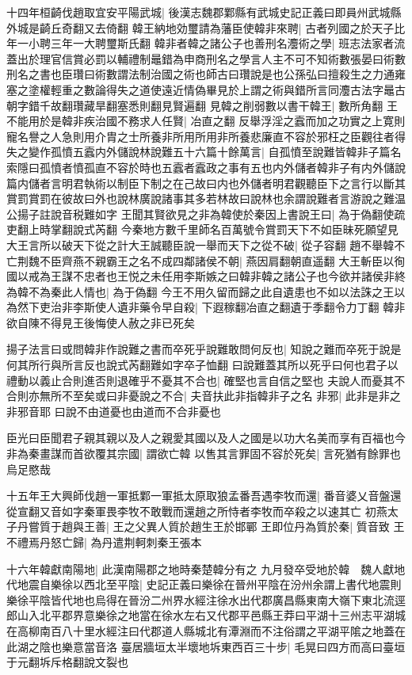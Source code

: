 十四年桓齮伐趙取宜安平陽武城|{
	後漢志魏郡鄴縣有武城史記正義曰即員州武城縣外城是齮丘奇翻又去倚翻}
韓王納地効璽請為藩臣使韓非來聘|{
	古者列國之於天子比年一小聘三年一大聘璽斯氏翻}
韓非者韓之諸公子也善刑名灋術之學|{
	班志法家者流蓋出於理官信賞必罰以輔禮制鼂錯為申商刑名之學言人主不可不知術數張晏曰術數刑名之書也臣瓚曰術數謂法制治國之術也師古曰瓚說是也公孫弘曰擅殺生之力通雍塞之塗權輕重之數論得失之道使遠近情偽畢見於上謂之術與錯所言同灋古法字鼂古朝字錯千故翻瓚藏旱翻塞悉則翻見賢遍翻}
見韓之削弱數以書干韓王|{
	數所角翻}
王不能用於是韓非疾治國不務求人任賢|{
	冶直之翻}
反舉浮淫之蠧而加之功實之上寛則寵名譽之人急則用介胄之士所養非所用所用非所養悲廉直不容於邪枉之臣觀往者得失之變作孤憤五蠧内外儲說林說難五十六篇十餘萬言|{
	自孤憤至說難皆韓非子篇名索隱曰孤憤者憤孤直不容於時也五蠧者蠧政之事有五也内外儲者韓非子有内外儲說篇内儲者言明君執術以制臣下制之在己故曰内也外儲者明君觀聽臣下之言行以斷其賞罰賞罰在彼故曰外也說林廣說諸事其多若林故曰說林也余謂說難者言游說之難温公揚子註說音税難如字}
王聞其賢欲見之非為韓使於秦因上書說王曰|{
	為于偽翻使疏吏翻上時掌翻說式芮翻}
今秦地方數千里師名百萬號令賞罰天下不如臣昧死願望見大王言所以破天下從之計大王誠聽臣說一舉而天下之從不破|{
	從子容翻}
趙不舉韓不亡荆魏不臣齊燕不親霸王之名不成四鄰諸侯不朝|{
	燕因肩翻朝直遥翻}
大王斬臣以徇國以戒為王謀不忠者也王悦之未任用李斯嫉之曰韓非韓之諸公子也今欲并諸侯非終為韓不為秦此人情也|{
	為于偽翻}
今王不用久留而歸之此自遺患也不如以法誅之王以為然下吏治非李斯使人遺非藥令早自殺|{
	下遐稼翻冶直之翻遺于季翻令力丁翻}
韓非欲自陳不得見王後悔使人赦之非已死矣

揚子法言曰或問韓非作說難之書而卒死乎說難敢問何反也|{
	知說之難而卒死于說是何其所行與所言反也說式芮翻難如字卒子恤翻}
曰說難蓋其所以死乎曰何也君子以禮動以義止合則進否則退確乎不憂其不合也|{
	確堅也言自信之堅也}
夫說人而憂其不合則亦無所不至矣或曰非憂說之不合|{
	夫音扶此非指韓非子之名}
非邪|{
	此非是非之非邪音耶}
曰說不由道憂也由道而不合非憂也

臣光曰臣聞君子親其親以及人之親愛其國以及人之國是以功大名美而享有百福也今非為秦畫謀而首欲覆其宗國|{
	謂欲亡韓}
以售其言罪固不容於死矣|{
	言死猶有餘罪也}
烏足愍哉

十五年王大興師伐趙一軍抵鄴一軍抵太原取狼孟番吾遇李牧而還|{
	番音婆乂音盤還從宣翻又音如字秦軍畏李牧不敢戰而還趙之所恃者李牧而卒殺之以速其亡}
初燕太子丹嘗質于趙與王善|{
	王之父異人質於趙生王於邯鄲}
王即位丹為質於秦|{
	質音致}
王不禮焉丹怒亡歸|{
	為丹遣荆軻刺秦王張本}


十六年韓獻南陽地|{
	此漢南陽郡之地時秦楚韓分有之}
九月發卒受地於韓　魏人獻地　代地震自樂徐以西北至平陰|{
	史記正義曰樂徐在晉州平陰在汾州余謂上書代地震則樂徐平陰皆代地也烏得在晉汾二州界水經注徐水出代郡廣昌縣東南大嶺下東北流逕郎山入北平郡界意樂徐之地當在徐水左右又代郡平邑縣王莽曰平湖十三州志平湖城在高柳南百八十里水經注曰代郡道人縣城北有潭淵而不注俗謂之平湖平隂之地蓋在此湖之陰也樂意當音洛}
臺居牆垣太半壞地坼東西百三十步|{
	毛晃曰四方而高曰臺垣于元翻坼斥格翻說文裂也}


